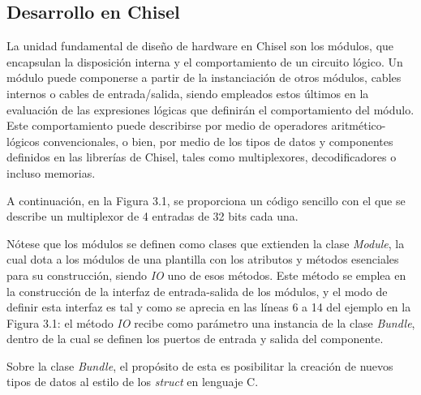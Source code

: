 \subsection{Desarrollo en Chisel}

La unidad fundamental de diseño de hardware en Chisel son los módulos, que encapsulan la disposición interna y el comportamiento de un circuito lógico. Un módulo puede componerse a partir de la instanciación de otros módulos, cables internos o cables de entrada/salida, siendo empleados estos últimos en la evaluación de las expresiones lógicas que definirán el comportamiento del módulo. Este comportamiento puede describirse por medio de operadores aritmético-lógicos convencionales, o bien, por medio de los tipos de datos y componentes definidos en las librerías de Chisel, tales como multiplexores, decodificadores o incluso memorias.

A continuación, en la Figura 3.1, se proporciona un código sencillo con el que se describe un multiplexor de 4 entradas de 32 bits cada una.

Nótese que los módulos se definen como clases que extienden la clase \textit{Module}, la cual dota a los módulos de una plantilla con los atributos y métodos esenciales para su construcción, siendo \textit{IO} uno de esos métodos. Este método se emplea en la construcción de la interfaz de entrada-salida de los módulos, y el modo de definir esta interfaz es tal y como se aprecia en las líneas 6 a 14 del ejemplo en la Figura 3.1: el método \textit{IO} recibe como parámetro una instancia de la clase \textit{Bundle}, dentro de la cual se definen los puertos de entrada y salida del componente.

Sobre la clase \textit{Bundle}, el propósito de esta es posibilitar la creación de nuevos tipos de datos al estilo de los \textit{struct} en lenguaje C.

